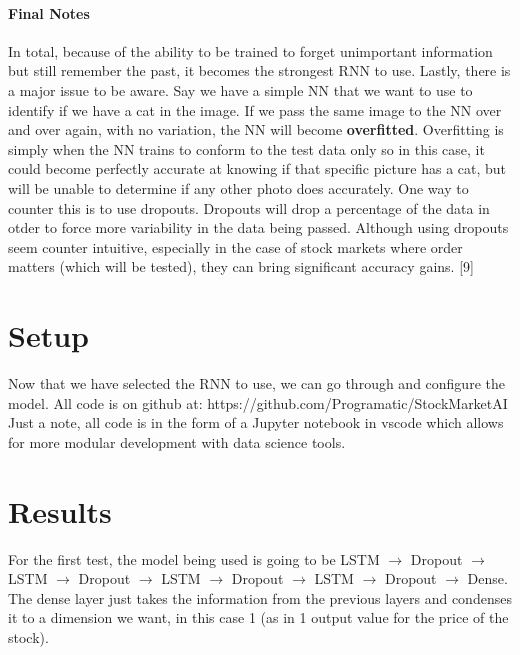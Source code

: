 \documentclass[12pt]{article}
\begin{document}
\paragraph{Final Notes}
In total, because of the ability to be trained to forget unimportant information but still remember the past, it becomes the strongest RNN to use. Lastly, there is a major issue to be aware. Say we have a simple NN that we want to use to identify if we have a cat in the image. If we pass the same image to the NN over and over again, with no variation, the NN will become \textbf{overfitted}. Overfitting is simply when the NN trains to conform to the test data only so in this case, it could become perfectly accurate at knowing if that specific picture has a cat, but will be unable to determine if any other photo does accurately. One way to counter this is to use dropouts. Dropouts will drop a percentage of the data in otder to force more variability in the data being passed. Although using dropouts seem counter intuitive, especially in the case of stock markets where order matters (which will be tested), they can bring significant accuracy gains. [9]  \nocite{yadav_2019}

\section{Setup}
Now that we have selected the RNN to use, we can go through and configure the model. All code is on github at: https://github.com/Programatic/StockMarketAI
Just a note, all code is in the form of a Jupyter notebook in vscode which allows for more modular development with data science tools. \\

\section{Results}
For the first test, the model being used is going to be LSTM $\rightarrow$ Dropout $\rightarrow$ LSTM $\rightarrow$ Dropout $\rightarrow$ LSTM $\rightarrow$ Dropout $\rightarrow$ LSTM $\rightarrow$ Dropout $\rightarrow$ Dense. The dense layer just takes the information from the previous layers and condenses it to a dimension we want, in this case 1 (as in 1 output value for the price of the stock). \\
\end{document}
